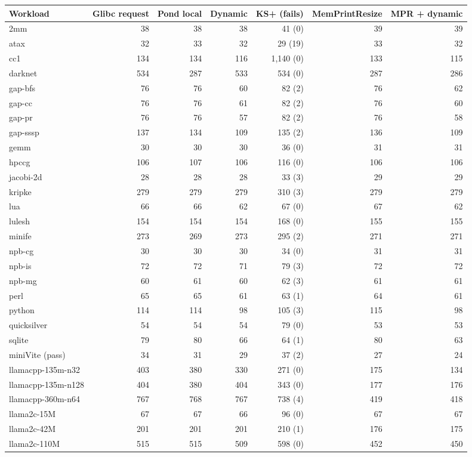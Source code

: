 \begin{tabular}{lrrrrrr}
\toprule
Workload & Glibc request & Pond local & Dynamic & KS+ (fails) & MemPrintResize & MPR + dynamic \\
\midrule
2mm & 38 & 38 & 38 & 41 (0) & 39 & 39 \\
atax & 32 & 33 & 32 & 29 (19) & 33 & 32 \\
cc1 & 134 & 134 & 116 & 1{,}140 (0) & 133 & 115 \\
darknet & 534 & 287 & 533 & 534 (0) & 287 & 286 \\
gap-bfs & 76 & 76 & 60 & 82 (2) & 76 & 62 \\
gap-cc & 76 & 76 & 61 & 82 (2) & 76 & 60 \\
gap-pr & 76 & 76 & 57 & 82 (2) & 76 & 58 \\
gap-sssp & 137 & 134 & 109 & 135 (2) & 136 & 109 \\
gemm & 30 & 30 & 30 & 36 (0) & 31 & 31 \\
hpccg & 106 & 107 & 106 & 116 (0) & 106 & 106 \\
jacobi-2d & 28 & 28 & 28 & 33 (3) & 29 & 29 \\
kripke & 279 & 279 & 279 & 310 (3) & 279 & 279 \\
lua & 66 & 66 & 62 & 67 (0) & 67 & 62 \\
lulesh & 154 & 154 & 154 & 168 (0) & 155 & 155 \\
minife & 273 & 269 & 273 & 295 (2) & 271 & 271 \\
npb-cg & 30 & 30 & 30 & 34 (0) & 31 & 31 \\
npb-is & 72 & 72 & 71 & 79 (3) & 72 & 72 \\
npb-mg & 60 & 61 & 60 & 62 (3) & 61 & 61 \\
perl & 65 & 65 & 61 & 63 (1) & 64 & 61 \\
python & 114 & 114 & 98 & 105 (3) & 115 & 98 \\
quicksilver & 54 & 54 & 54 & 79 (0) & 53 & 53 \\
sqlite & 79 & 80 & 66 & 64 (1) & 80 & 63 \\
miniVite (pass) & 34 & 31 & 29 & 37 (2) & 27 & 24 \\
llamacpp-135m-n32 & 403 & 380 & 330 & 271 (0) & 175 & 134 \\
llamacpp-135m-n128 & 404 & 380 & 404 & 343 (0) & 177 & 176 \\
llamacpp-360m-n64 & 767 & 768 & 767 & 738 (4) & 419 & 418 \\
llama2c-15M & 67 & 67 & 66 & 96 (0) & 67 & 67 \\
llama2c-42M & 201 & 201 & 201 & 210 (1) & 176 & 175 \\
llama2c-110M & 515 & 515 & 509 & 598 (0) & 452 & 450 \\
\bottomrule
\end{tabular}
